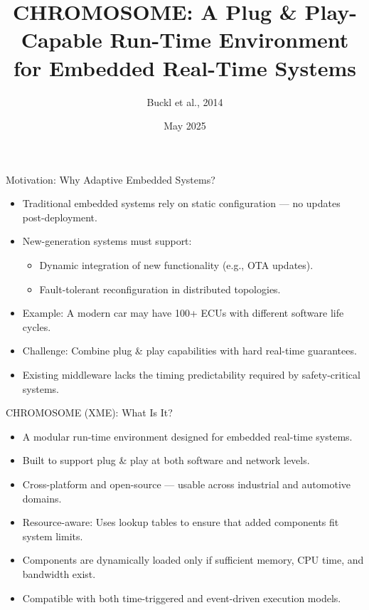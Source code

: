 \documentclass{beamer}
\title[CHROMOSOME RTE]{CHROMOSOME: A Plug \& Play-Capable Run-Time Environment for Embedded Real-Time Systems}
\author{Buckl et al., 2014}
\institute{fortiss GmbH \& Technische Universität München}
\date{May 2025}
\begin{document}
\begin{frame}
  \titlepage
\end{frame}

\begin{frame}{Motivation: Why Adaptive Embedded Systems?}
  \begin{itemize}
    \item Traditional embedded systems rely on static configuration — no updates post-deployment.
    \item New-generation systems must support:
    \begin{itemize}
      \item Dynamic integration of new functionality (e.g., OTA updates).
      \item Fault-tolerant reconfiguration in distributed topologies.
    \end{itemize}
    \item Example: A modern car may have 100+ ECUs with different software life cycles.
    \item Challenge: Combine plug \& play capabilities with hard real-time guarantees.
    \item Existing middleware lacks the timing predictability required by safety-critical systems.
  \end{itemize}
\end{frame}

\begin{frame}{CHROMOSOME (XME): What Is It?}
  \begin{itemize}
    \item A modular run-time environment designed for embedded real-time systems.
    \item Built to support plug \& play at both software and network levels.
    \item Cross-platform and open-source — usable across industrial and automotive domains.
    \item Resource-aware: Uses lookup tables to ensure that added components fit system limits.
    \item Components are dynamically loaded only if sufficient memory, CPU time, and bandwidth exist.
    \item Compatible with both time-triggered and event-driven execution models.
  \end{itemize}
\end{frame}
\end{document}
